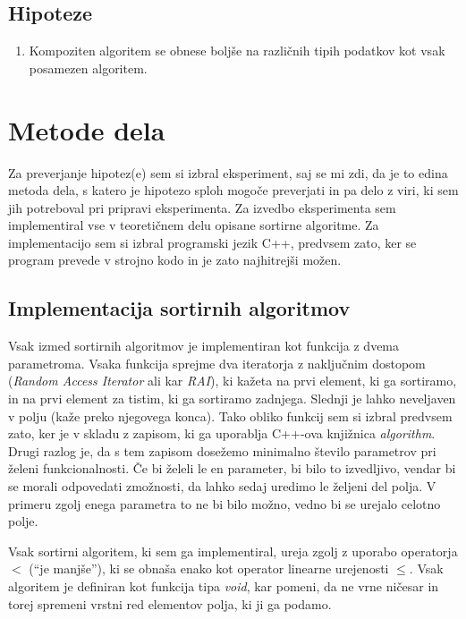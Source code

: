 \documentclass[a4paper,oneside,10pt]{article}
\begin{document}
\subsection{Hipoteze}
\begin{enumerate}
  \item Kompoziten algoritem se obnese boljše na različnih tipih podatkov kot vsak
    posamezen algoritem.
\end{enumerate}
\section{Metode dela}
Za preverjanje hipotez(e) sem si izbral eksperiment, saj se mi zdi, da je to edina metoda
dela, s katero je hipotezo sploh mogoče preverjati in pa delo z viri, ki sem jih
potreboval pri pripravi eksperimenta.
Za izvedbo eksperimenta sem implementiral vse v teoretičnem delu opisane sortirne
algoritme. Za implementacijo sem si izbral programski jezik C++, predvsem zato,
ker se program prevede v strojno kodo in je zato najhitrejši možen. 

\subsection{Implementacija sortirnih algoritmov}
\label{chapter:sortimplementation}
Vsak izmed sortirnih algoritmov je implementiran kot funkcija z dvema parametroma.
Vsaka funkcija sprejme dva iteratorja z naključnim dostopom (\emph{Random Access
Iterator} ali kar \emph{RAI}),
ki kažeta na prvi element, ki ga sortiramo, in na prvi element za tistim, ki ga sortiramo
zadnjega. Slednji je lahko neveljaven v polju (kaže preko njegovega konca).
Tako obliko funkcij sem si izbral predvsem zato, ker je v skladu z zapisom, ki ga uporablja
C++-ova knjižnica \emph{algorithm}. Drugi razlog je, da s tem zapisom dosežemo minimalno število
parametrov pri želeni funkcionalnosti. Če bi želeli le en parameter, bi bilo to
izvedljivo, vendar bi se morali odpovedati zmožnosti, da lahko sedaj uredimo le željeni
del polja. V primeru zgolj enega parametra to ne bi bilo možno, vedno bi se
urejalo celotno polje.

Vsak sortirni algoritem, ki sem ga implementiral, ureja zgolj z uporabo operatorja $<$
(``je manjše''), ki se obnaša enako kot operator linearne urejenosti $\leq$. Vsak
algoritem je definiran kot funkcija tipa \emph{void}, kar pomeni, da ne vrne ničesar in
torej spremeni vrstni red elementov polja, ki ji ga podamo.
\end{document}
